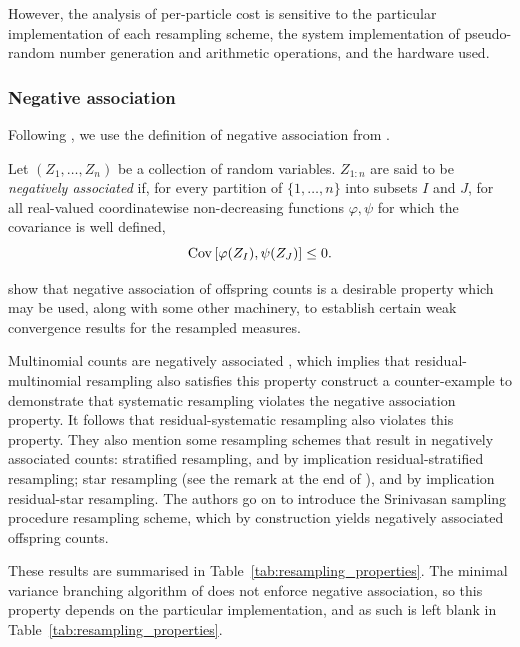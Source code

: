 However, the analysis of per-particle cost is sensitive to the particular implementation of each resampling scheme, the system implementation of pseudo-random number generation and arithmetic operations, and the hardware used.




\subsubsection{Negative association \seb{$\checkmark$} }
Following \textcite{gerber2017}, we use the definition of negative association from \textcite{joag1983}.
\begin{defn}
Let $(Z_1, \dots, Z_n)$ be a collection of random variables. 
$Z_{1:n}$ are said to be \emph{negatively associated} if, for every partition of $\{1,\dots, n\}$ into subsets $I$ and $J$, for all real-valued coordinatewise non-decreasing functions $\varphi, \psi$ for which the covariance is well defined,
\begin{equation*}
\operatorname{Cov} \left[ \varphi( Z_I) , \psi(Z_J) \right] \leq 0 .
\end{equation*}
\end{defn}
\textcite{gerber2017} show that negative association of offspring counts is a desirable property which may be used, along with some other machinery, to establish certain weak convergence results for the resampled measures.

Multinomial counts are negatively associated \parencite[Section 3.1]{joag1983}, which implies that residual-multinomial resampling also satisfies this property
\textcite{gerber2017} construct a counter-example to demonstrate that systematic resampling violates the negative association property. It follows that residual-systematic resampling also violates this property.
They also mention some resampling schemes that result in negatively associated counts: stratified resampling, and by implication residual-stratified resampling; star resampling (see the remark at the end of \textcite[Section 3.2]{gerber2017}), and by implication residual-star resampling.
The authors go on to introduce the Srinivasan sampling procedure resampling scheme, which by construction yields negatively associated offspring counts.

These results are summarised in Table~\ref{tab:resampling_properties}.
The minimal variance branching algorithm of \textcite{crisan1997} does not enforce negative association, so this property depends on the particular implementation, and as such is left blank in Table~\ref{tab:resampling_properties}.







